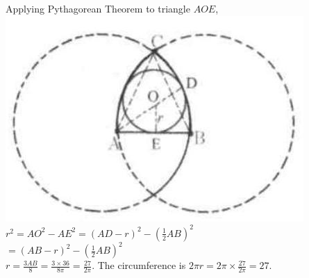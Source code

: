 \documentclass{article}
\begin{document}
Applying Pythagorean Theorem to triangle \(A O E\),\\
\centering
\includegraphics[width=\textwidth]{images/213.jpg}\\
\(r^{2}=A O^{2}-A E^{2}=(A D-r)^{2}-\left(\frac{1}{2} A B\right)^{2}\)\\
\(=(A B-r)^{2}-\left(\frac{1}{2} A B\right)^{2}\)\\
\(r=\frac{3 A B}{8}=\frac{3 \times 36}{8 \pi}=\frac{27}{2 \pi}\). The circumference is \(2 \pi r=2 \pi \times \frac{27}{2 \pi}=27\).
\end{document}
